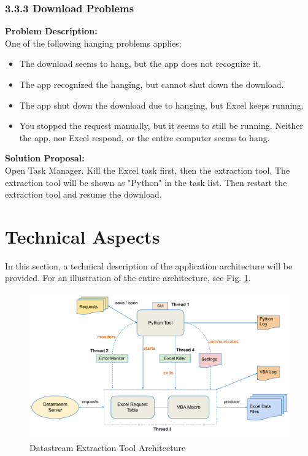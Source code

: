 \subsubsection{3.3.3 Download Problems}
\textbf{Problem Description: }  \\
One of the following hanging problems applies: 
\begin{itemize}
	\item The download seems to hang, but the app does not recognize it. 
	\item The app recognized the hanging, but cannot shut down the download. 
	\item The app shut down the download due to hanging, but Excel keeps running. 
	\item You stopped the request manually, but it seems to still be running. 
	Neither the app, nor Excel respond, or the entire computer seems to hang. 
\end{itemize} 
\textbf{Solution Proposal:} \\
Open Task Manager. Kill the Excel task first, then the extraction tool. The extraction tool will be shown as "Python" in the task list. Then restart the extraction tool and resume the download. 

\section{Technical Aspects} \label{appendix:technical-aspects}
In this section, a technical description of the application architecture will be provided. For an illustration of the entire architecture, see Fig. \ref{fig:ds-extraction-tool-arch}. 
\begin{figure}[h]
	\centering
	\includegraphics[width=1.1\linewidth]{figures/ds-extraction-tool-architecture}
	\caption{Datastream Extraction Tool Architecture}
	\label{fig:ds-extraction-tool-arch}
\end{figure}

